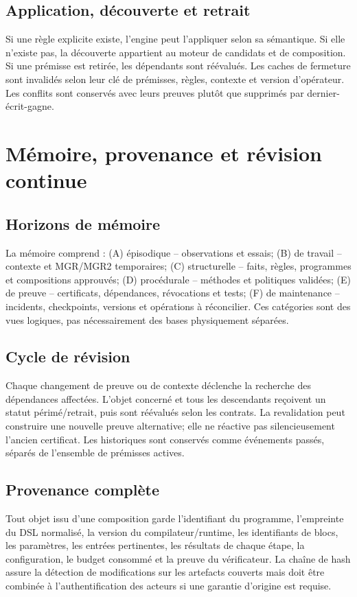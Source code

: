 \documentclass[11pt,a4paper]{article}
\begin{document}
\subsection{Application, découverte et retrait}
Si une règle explicite existe, l'engine peut l'appliquer selon sa sémantique. Si elle n'existe pas, la découverte appartient au moteur de candidats et de composition. Si une prémisse est retirée, les dépendants sont réévalués. Les caches de fermeture sont invalidés selon leur clé de prémisses, règles, contexte et version d'opérateur. Les conflits sont conservés avec leurs preuves plutôt que supprimés par dernier-écrit-gagne.

\section{Mémoire, provenance et révision continue}
\subsection{Horizons de mémoire}
La mémoire comprend : (A) épisodique -- observations et essais; (B) de travail -- contexte et MGR/MGR2 temporaires; (C) structurelle -- faits, règles, programmes et compositions approuvés; (D) procédurale -- méthodes et politiques validées; (E) de preuve -- certificats, dépendances, révocations et tests; (F) de maintenance -- incidents, checkpoints, versions et opérations à réconcilier. Ces catégories sont des vues logiques, pas nécessairement des bases physiquement séparées.

\subsection{Cycle de révision}
Chaque changement de preuve ou de contexte déclenche la recherche des dépendances affectées. L'objet concerné et tous les descendants reçoivent un statut périmé/retrait, puis sont réévalués selon les contrats. La revalidation peut construire une nouvelle preuve alternative; elle ne réactive pas silencieusement l'ancien certificat. Les historiques sont conservés comme événements passés, séparés de l'ensemble de prémisses actives.

\subsection{Provenance complète}
Tout objet issu d'une composition garde l'identifiant du programme, l'empreinte du DSL normalisé, la version du compilateur/runtime, les identifiants de blocs, les paramètres, les entrées pertinentes, les résultats de chaque étape, la configuration, le budget consommé et la preuve du vérificateur. La chaîne de hash assure la détection de modifications sur les artefacts couverts mais doit être combinée à l'authentification des acteurs si une garantie d'origine est requise.
\end{document}
